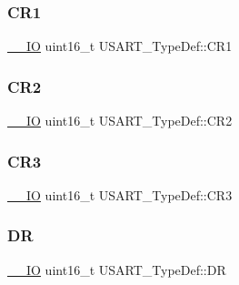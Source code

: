 \subsubsection{\texorpdfstring{CR1}{CR1}}
{\footnotesize\ttfamily \mbox{\hyperlink{group___c_m_s_i_s___c_m3__core__definitions_gaec43007d9998a0a0e01faede4133d6be}{\+\_\+\+\_\+\+IO}} uint16\+\_\+t U\+S\+A\+R\+T\+\_\+\+Type\+Def\+::\+C\+R1}

\mbox{\label{struct_u_s_a_r_t___type_def_a2a494156d185762e4596696796c393bc}} 
\subsubsection{\texorpdfstring{CR2}{CR2}}
{\footnotesize\ttfamily \mbox{\hyperlink{group___c_m_s_i_s___c_m3__core__definitions_gaec43007d9998a0a0e01faede4133d6be}{\+\_\+\+\_\+\+IO}} uint16\+\_\+t U\+S\+A\+R\+T\+\_\+\+Type\+Def\+::\+C\+R2}

\mbox{\label{struct_u_s_a_r_t___type_def_a2b9d1df38cb1d745305c8190a8707a0f}} 
\subsubsection{\texorpdfstring{CR3}{CR3}}
{\footnotesize\ttfamily \mbox{\hyperlink{group___c_m_s_i_s___c_m3__core__definitions_gaec43007d9998a0a0e01faede4133d6be}{\+\_\+\+\_\+\+IO}} uint16\+\_\+t U\+S\+A\+R\+T\+\_\+\+Type\+Def\+::\+C\+R3}

\mbox{\label{struct_u_s_a_r_t___type_def_accee34aaec89aad4aeef512bba173ae5}} 
\subsubsection{\texorpdfstring{DR}{DR}}
{\footnotesize\ttfamily \mbox{\hyperlink{group___c_m_s_i_s___c_m3__core__definitions_gaec43007d9998a0a0e01faede4133d6be}{\+\_\+\+\_\+\+IO}} uint16\+\_\+t U\+S\+A\+R\+T\+\_\+\+Type\+Def\+::\+DR}

\mbox{\label{struct_u_s_a_r_t___type_def_abe51502097b1fd281d0a2a1b157d769e}} 
